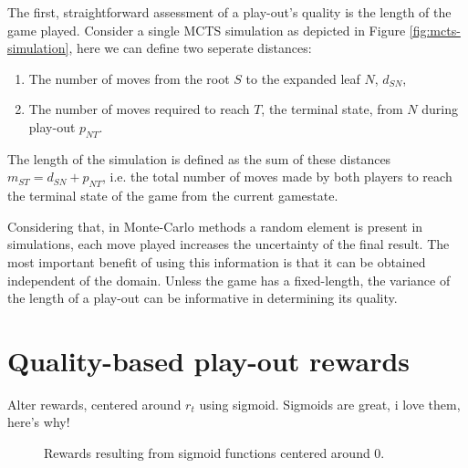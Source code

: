 \documentclass{ecai2010}
\begin{document}
The first, straightforward assessment of a play-out's quality is the length of the game played. Consider a single MCTS simulation as depicted in Figure \ref{fig:mcts-simulation}, here we can define two seperate distances: 
\begin{enumerate}
\item The number of moves from the root $S$ to the expanded leaf $N$, $d_{SN}$,
\item The number of moves required to reach $T$, the terminal state, from $N$ during play-out $p_{NT}$.
\end{enumerate}
The length of the simulation is defined as the sum of these distances $m_{ST} = d_{SN} + p_{NT}$, i.e. the total number of moves made by both players to reach the terminal state of the game from the current gamestate.

Considering that, in Monte-Carlo methods a random element is present in simulations, each move played increases the uncertainty of the final result. The most important benefit of using this information is that it can be obtained independent of the domain. Unless the game has a fixed-length, the variance of the length of a play-out can be informative in determining its quality.

\section{Quality-based play-out rewards}
Alter rewards, centered around $r_t$ using sigmoid. Sigmoids are great, i love them, here's why!
\begin{figure}[ht]
    \caption{Rewards resulting from sigmoid functions centered around 0.}
	\label{fig:sigmoids}
\end{figure}
\end{document}
